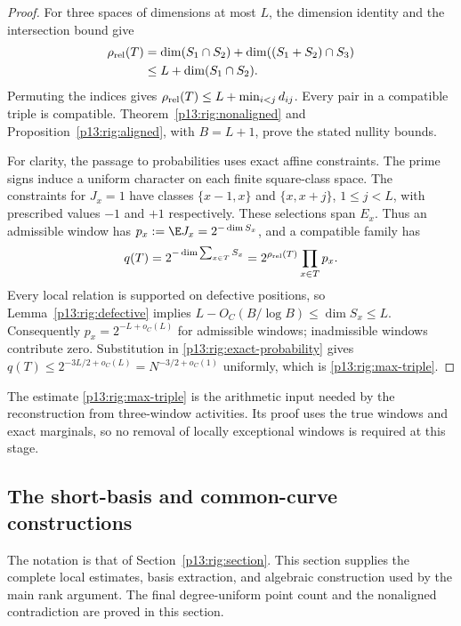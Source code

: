 \begin{proof}
For three spaces of dimensions at most $L$, the dimension
identity and the intersection bound give
\[
 \begin{split}
 \rho_{\rm rel}(T)
 &=\dim(S_1\cap S_2)+\dim((S_1+S_2)\cap S_3)\\
 &\le L+\dim(S_1\cap S_2).
 \end{split}
\]
Permuting the indices gives
$\rho_{\rm rel}(T)\le L+\min_{i<j}d_{ij}$.
Every pair in a compatible triple is compatible.
Theorem~\ref{p13:rig:nonaligned} and
Proposition~\ref{p13:rig:aligned}, with $B=L+1$, prove
the stated nullity bounds.

For clarity, the passage to probabilities uses exact
affine constraints.  The prime signs induce a uniform
character on each finite square-class space.  The
constraints for $J_x=1$ have classes
$\{x-1,x\}$ and $\{x,x+j\}$, $1\le j<L$, with prescribed
values $-1$ and $+1$ respectively.  These selections span
$E_x$.  Thus an admissible window has
$p_x:=\E J_x=2^{-\dim S_x}$, and a compatible family has
\begin{equation}
 q(T)=2^{-\dim\sum_{x\in T}S_x}
                  =2^{\rho_{\rm rel}(T)}\prod_{x\in T}p_x.
 \label{p13:rig:exact-probability}
\end{equation}
Every local relation is supported on defective positions,
so Lemma~\ref{p13:rig:defective} implies
$L-O_C(B/\log B)\le\dim S_x\le L$.
Consequently $p_x=2^{-L+o_C(L)}$ for admissible windows;
inadmissible windows contribute zero.  Substitution in
\eqref{p13:rig:exact-probability} gives
$q(T)\le2^{-3L/2+o_C(L)}=N^{-3/2+o_C(1)}$ uniformly,
which is \eqref{p13:rig:max-triple}.
\end{proof}

The estimate \eqref{p13:rig:max-triple} is the arithmetic
input needed by the reconstruction from three-window
activities.  Its proof uses the true windows and exact
marginals, so no removal of locally exceptional windows
is required at this stage.

\subsection{The short-basis and common-curve constructions}
\label{p14:comp:rigidity}

The notation is that of Section~\ref{p13:rig:section}.  This section
supplies the complete local estimates, basis extraction, and algebraic
construction used by the main rank argument.  The final
degree-uniform point count and the nonaligned contradiction are proved
in this section.

